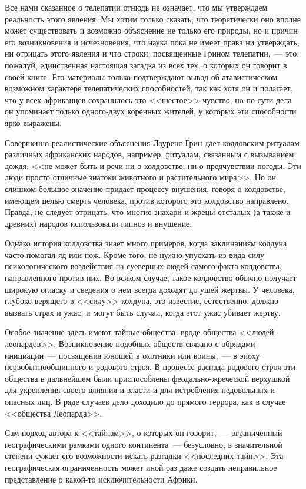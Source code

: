 \documentclass[12pt,a4paper,twoside,openany,svgnames]{memoir}
\begin{document}
Все нами сказанное о телепатии отнюдь не означает, что мы утверждаем реальность этого явления. Мы хотим только сказать, что теоретически оно вполне может существовать и возможно объяснение не только его природы, но и причин его возникновения и исчезновения, что наука пока не имеет права ни утверждать, ни отрицать этого явления и что строки, посвященные Грином телепатии,~--- это, пожалуй, единственная настоящая загадка из всех тех, о которых он говорит в своей книге. Его материалы только подтверждают вывод об атавистическом возможном характере телепатических способностей, так как хотя он и полагает, что у всех африканцев сохранилось это <<шестое>> чувство, но по сути дела он упоминает только одного-двух коренных жителей, у которых эти способности ярко выражены.

Совершенно реалистические объяснения Лоуренс Грин дает колдовским ритуалам различных африканских народов, например, ритуалам, связанным с вызыванием дождя: << не может быть и речи ни о колдовстве, ни о предчувствии погоды. Эти люди просто отличные знатоки животного и растительного мира>>. Но он слишком большое значение придает процессу внушения, говоря о колдовстве, имеющем целью смерть человека, против которого это колдовство направлено. Правда, не следует отрицать, что многие знахари и жрецы отсталых (а также и древних) народов использовали гипноз и внушение.

Однако история колдовства знает много примеров, когда заклинаниям колдуна часто помогал яд или нож. Кроме того, не нужно упускать из вида силу психологического воздействия на суеверных людей самого факта колдовства, направленного против них. Во всяком случае, такое колдовство обычно получает широкую огласку и сведения о нем всегда доходят до ушей жертвы. У человека, глубоко верящего в <<силу>> колдуна, это известие, естественно, должно вызвать страх и ужас, и могут быть случаи, когда этот ужас убивает жертву.

Особое значение здесь имеют тайные общества, вроде общества <<людей-леопардов>>. Возникновение подобных обществ связано с обрядами инициации~--- посвящения юношей в охотники или воины,~--- в эпоху первобытнообщинного и родового строя. В процессе распада родового строя эти общества в дальнейшем были приспособлены феодально-жреческой верхушкой для укрепления своего влияния и власти и для истребления недовольных и опасных лиц. В ряде случаев дело доходило до прямого террора, как в случае <<общества Леопарда>>.

Сам подход автора к <<тайнам>>, о которых он говорит,~--- ограниченный географическими рамками одного континента~--- безусловно, в значительной степени сужает его возможности искать разгадки <<последних тайн>>. Эта географическая ограниченность может иной раз даже создать неправильное представление о какой-то исключительности Африки.
\end{document}
